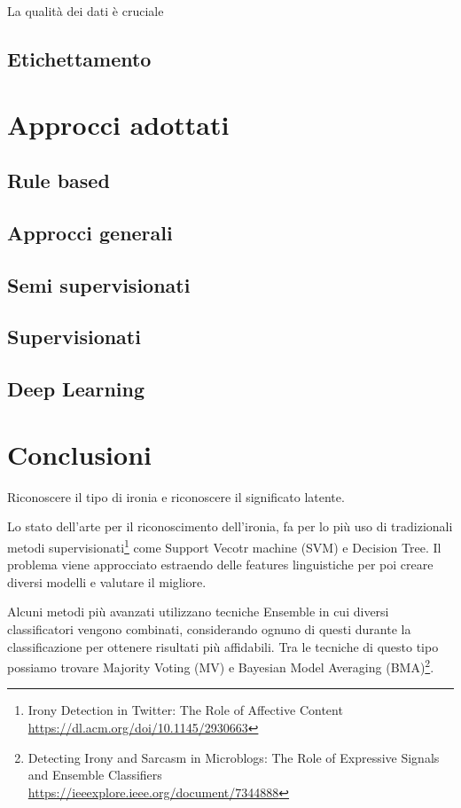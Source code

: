 \documentclass[oneside]{book}
\begin{document}
La qualità dei dati è cruciale
\subsection{Etichettamento}


\section{Approcci adottati}
\subsection{Rule based}
\subsection{Approcci generali}
\subsection{Semi supervisionati}
\subsection{Supervisionati}
\subsection{Deep Learning}

\section{Conclusioni}
Riconoscere il tipo di ironia e riconoscere il significato latente.


Lo stato dell'arte per il riconoscimento dell'ironia, fa per lo più uso di tradizionali metodi supervisionati\footnote{Irony Detection in Twitter: The Role of Affective Content\\ \url{https://dl.acm.org/doi/10.1145/2930663}}
come Support Vecotr machine (SVM) e Decision Tree. Il problema viene approcciato estraendo delle features linguistiche per poi creare diversi modelli e valutare il migliore.

Alcuni metodi più avanzati utilizzano tecniche Ensemble in cui diversi classificatori vengono combinati, considerando ognuno di questi durante la classificazione per ottenere risultati più affidabili. Tra le tecniche di questo tipo possiamo trovare Majority Voting (MV) e Bayesian Model Averaging (BMA)\footnote{Detecting Irony and Sarcasm in Microblogs: The Role of Expressive Signals and Ensemble Classifiers\\ \url{https://ieeexplore.ieee.org/document/7344888}}.
\end{document}
